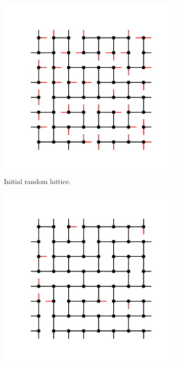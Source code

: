 \begin{figure}[bt]
     \centering
     
     \begin{subfigure}[b]{0.3\textwidth}
         \centering
         \includegraphics[width=\textwidth]{./figures/procrystals/pro_mc_1.pdf}
         \caption{Initial random lattice.}
         \label{fig:promca}
     \end{subfigure}
     \hfill
     \begin{subfigure}[b]{0.3\textwidth}
         \centering
         \includegraphics[width=\textwidth]{./figures/procrystals/pro_mc_3.pdf}

\end{subfigure}
\end{figure}
